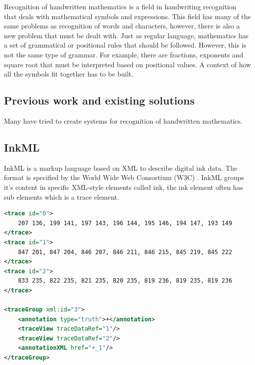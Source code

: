 Recognition of handwritten mathematics is a field in handwriting recognition that deals with mathematical symbols and expressions. This field has many of the same problems as recognition of words and characters, however, there is also a new problem that must be dealt with. Just as regular language, mathematics has a set of grammatical or positional rules that should be followed. However, this is not the same type of grammar. For example, there are fractions, exponents and square root that must be interpreted based on positional values. A context of how all the symbols fit together has to be built.


\begin{figure}[H]
  \centering
\end{figure}




\subsection{Previous work and existing solutions}
Many have tried to create systems for recognition of handwritten mathematics. 



\subsection{InkML}
InkML is a markup language based on XML to describe digital ink data. The format is specified by the World Wide Web Consortium (W3C) \cite{chee_ink_2011}. InkML groups it's content in specific XML-style elements called ink, the ink element often has sub elements which is a trace element.\\

\begin{minipage}{\linewidth}
\begin{lstlisting}[language=XML, %
label={lst:InkML_ex},
caption={\textbf{\gls{InkML}} example of three traces, each with an file-unique id. In addition to traces, we have listed a tracegroup, which specifies what and where the traces belong to. Truths are used when providing labels to use in supervised learning, which is explained later in this chapter.}]
<trace id="0">
    207 136, 199 141, 197 143, 196 144, 195 146, 194 147, 193 149
</trace>
<trace id="1">
    847 201, 847 204, 846 207, 846 211, 846 215, 845 219, 845 222
</trace>
<trace id="2">
    833 235, 822 235, 821 235, 820 235, 819 236, 819 235, 819 236
</trace>

<traceGroup xml:id="3">
	<annotation type="truth">+</annotation>
	<traceView traceDataRef="1"/>
	<traceView traceDataRef="2"/>
	<annotationXML href="+_1"/>
</traceGroup>
\end{lstlisting}
\end{minipage}


